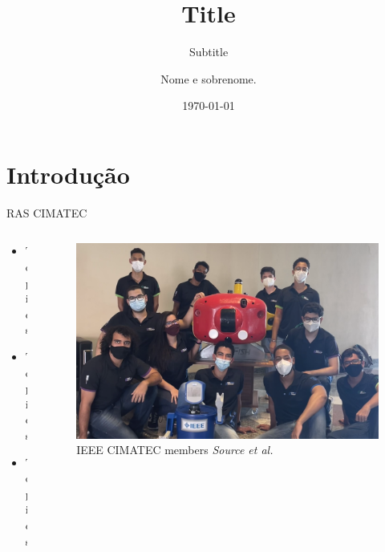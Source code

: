 \documentclass{cubeamer}
\title{Title}
\subtitle{Subtitle}
\author[Nome e sobrenome]{Nome e sobrenome.}
\date{\today} %
\institute[SENAI CIMATEC]{SENAI CIMATEC - IEEE ROBOTICS AND AUTOMATION SOCIETY}
\begin{document}
\maketitle

\cutoc

\section{Introdução}

\begin{frame}{RAS CIMATEC}
    \begin{columns}
        \begin{column}{0.4\textwidth}
            \begin{itemize}
                \item Topics
                \item Topics
                \item Topics
            \end{itemize}
        \end{column}

        \begin{column}{0.6\textwidth}
            \begin{figure}
                \centering
                \includegraphics[height = 0.6\textheight]{img/team2.png}
                \caption{IEEE CIMATEC members \textit{Source et al.}}
            \end{figure}
        \end{column}

    \end{columns}
\end{frame}
\end{document}
